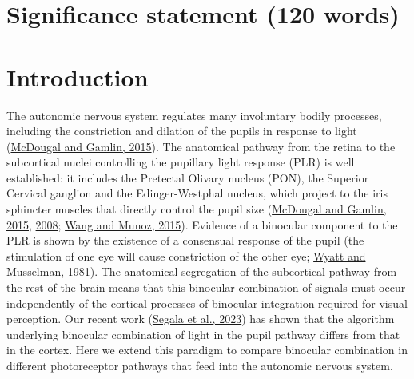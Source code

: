 \documentclass[
]{article}
\begin{document}
\hypertarget{significance-statement-120-words}{%
\section{Significance statement (120 words)}\label{significance-statement-120-words}}

\hypertarget{introduction}{%
\section{Introduction}\label{introduction}}

The autonomic nervous system regulates many involuntary bodily processes, including the constriction and dilation of the pupils in response to light (\protect\hyperlink{ref-McDougal2015}{McDougal and Gamlin, 2015}). The anatomical pathway from the retina to the subcortical nuclei controlling the pupillary light response (PLR) is well established: it includes the Pretectal Olivary nucleus (PON), the Superior Cervical ganglion and the Edinger-Westphal nucleus, which project to the iris sphincter muscles that directly control the pupil size (\protect\hyperlink{ref-McDougal2015}{McDougal and Gamlin, 2015}, \protect\hyperlink{ref-McDougal2008}{2008}; \protect\hyperlink{ref-Wang2015}{Wang and Munoz, 2015}). Evidence of a binocular component to the PLR is shown by the existence of a consensual response of the pupil (the stimulation of one eye will cause constriction of the other eye; \protect\hyperlink{ref-Wyatt1981}{Wyatt and Musselman, 1981}). The anatomical segregation of the subcortical pathway from the rest of the brain means that this binocular combination of signals must occur independently of the cortical processes of binocular integration required for visual perception. Our recent work (\protect\hyperlink{ref-Segala2023}{Segala et al., 2023}) has shown that the algorithm underlying binocular combination of light in the pupil pathway differs from that in the cortex. Here we extend this paradigm to compare binocular combination in different photoreceptor pathways that feed into the autonomic nervous system.
\end{document}
